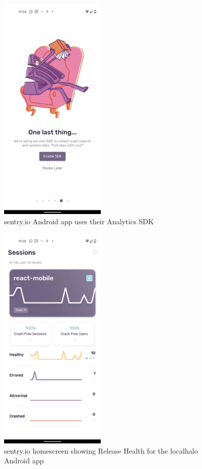 \begin{figure}
    \centering
    \includegraphics[width=5cm]{images/sentry.io/Screenshot_20210914-192435.png}
    \caption{sentry.io Android app uses their Analytics SDK}
    \label{fig:sentry-io-analytics-sdk-opt-in}
\end{figure}

\begin{figure}
    \centering
    \includegraphics[width=5cm]{images/sentry.io/Screenshot_20210914-192538.png}
    \caption{sentry.io homescreen showing Release Health for the localhalo Android app}
    \label{fig:sentry-io-homescreen-release-health-for-localhalo-android}
\end{figure}


